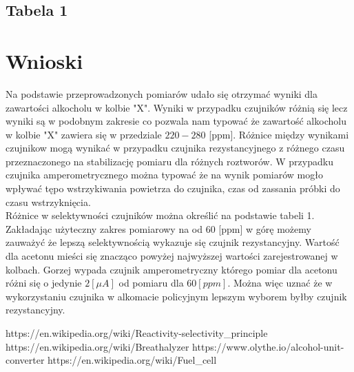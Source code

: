 \documentclass[11pt]{article}
\begin{document}
    \subsection{Tabela 1}
    \begin{center}
        \Large{}
    \end{center}
    \section{Wnioski}
    \par Na podstawie przeprowadzonych pomiarów udało się otrzymać wyniki dla zawartości alkocholu w kolbie "X". Wyniki w przypadku czujników różnią
    się lecz wyniki są w podobnym zakresie co pozwala nam typować że zawartość alkocholu w kolbie "X" zawiera się w przedziale $220-280$ [ppm]. Różnice
    między wynikami czujnikow mogą wynikać w przypadku czujnika rezystancyjnego z różnego czasu przeznaczonego na stabilizację pomiaru dla różnych roztworów.
    W przypadku czujnika amperometrycznego można typować że na wynik pomiarów mogło wpływać tępo wstrzykiwania powietrza do czujnika, czas od zassania
    próbki do czasu wstrzyknięcia.\\
    \indent Różnice w selektywności czujników można określić na podstawie tabeli 1. Zakładając użyteczny zakres pomiarowy na od 60 [ppm] w górę możemy
    zauważyć że lepszą selektywnością wykazuje się czujnik rezystancyjny. Wartość dla acetonu mieści się znacząco powyżej najwyższej wartości zarejestrowanej
    w kolbach. Gorzej wypada czujnik amperometryczny którego pomiar dla acetonu różni się o jedynie $2 [\mu A]$ od pomiaru dla $60[ppm]$. Można więc uznać że
    w wykorzystaniu czujnika w alkomacie policyjnym lepszym wyborem byłby czujnik rezystancyjny.



    \vfill
    \footnotesize
    \begin{thebibliography}{3}
        https://en.wikipedia.org/wiki/Reactivity-selectivity\_principle
        https://en.wikipedia.org/wiki/Breathalyzer
        https://www.olythe.io/alcohol-unit-converter
        https://en.wikipedia.org/wiki/Fuel\_cell
    \end{thebibliography}
\end{document}
